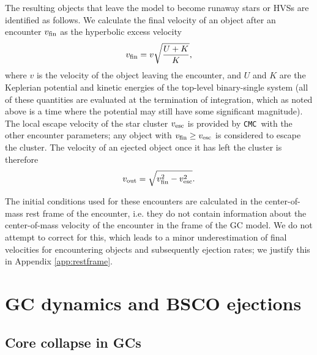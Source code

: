 \documentclass[twocolumn]{aastex631}
\newcommand{\CMC}{\texttt{CMC}}
\begin{document}
The resulting objects that leave the model to become runaway stars or HVSs are identified as follows.
We calculate the final velocity of an object after an encounter $v_{\rm fin}$ as the hyperbolic excess velocity
\begin{equation}
    v_{\rm fin} = v \sqrt{\frac{U + K}{K}},
\end{equation}
\noindent where $v$ is the velocity of the object leaving the encounter, and $U$ and $K$ are the Keplerian potential and kinetic energies of the top-level binary-single system (all of these quantities are evaluated at the termination of integration, which as noted above is a time where the potential may still have some significant magnitude).
The local escape velocity of the star cluster $v_{\rm esc}$ is provided by \CMC\ with the other encounter parameters; any object with $v_{\rm fin} \ge v_{\rm esc}$ is considered to escape the cluster.
The velocity of an ejected object once it has left the cluster is therefore
\begin{equation}
    v_{\rm out} = \sqrt{v_{\rm fin}^2 - v_{\rm esc}^2}.
\end{equation}

The initial conditions used for these encounters are calculated in the center-of-mass rest frame of the encounter, i.e. they do not contain information about the center-of-mass velocity of the encounter in the frame of the GC model.
We do not attempt to correct for this, which leads to a minor underestimation of final velocities for encountering objects and subsequently ejection rates; we justify this in Appendix \ref{app:restframe}.

\section{GC dynamics and BSCO ejections} \label{sec:gcdyns}

\subsection{Core collapse in GCs} \label{subsec:cc}
\end{document}
